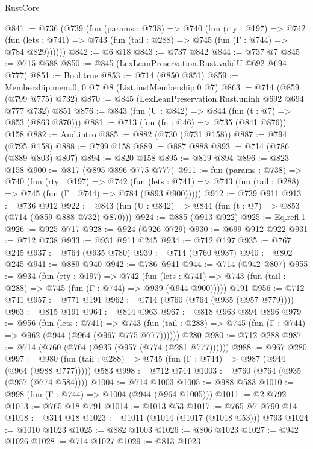 \begin{lexlean}{RustCore}
\begin{coremodule}
@841 := @736
    (@739
      (fun (params : @738) =>
      @740
        (fun (rty : @197) =>
        @742
          (fun (lets : @741) => @743 (fun (tail : @288) => @745 (fun (Γ : @744) => @784 @829))))))
@842 := @6 @18
@843 := @737 @842
@844 := @737 @7
@845 := @715 @688
@850 := @845 (LexLeanPreservation.Rust.validU @692 @694 @777)
@851 := Bool.true
@853 := @714 (@850 @851)
@859 := Membership.mem.{0, 0} @7 @8 (List.instMembership.{0} @7)
@863 := @714 (@859 (@799 @775) @732)
@870 := @845 (LexLeanPreservation.Rust.uninh @692 @694 @777 @732) @851
@876 := @843 (fun (U : @842) => @844 (fun (t : @7) => @853 (@863 @870)))
@881 := @713 (fun (fn : @46) => @735 (@841 @876)) @158
@882 := And.intro
@885 := @882 (@730 (@731 @158))
@887 := @794 (@795 @158)
@888 := @799 @158
@889 := @887 @888
@893 := @714 (@786 (@889 @803) @807)
@894 := @820 @158
@895 := @819 @894
@896 := @823 @158
@900 := @817 (@895 @896 @775 @777)
@911 := fun (params : @738) =>
  @740
    (fun (rty : @197) =>
    @742
      (fun (lets : @741) => @743 (fun (tail : @288) => @745 (fun (Γ : @744) => @784 (@893 @900)))))
@912 := @739 @911
@913 := @736 @912
@922 := @843 (fun (U : @842) => @844 (fun (t : @7) => @853 (@714 (@859 @888 @732) @870)))
@924 := @885 (@913 @922)
@925 := Eq.refl.{1}
@926 := @925 @717
@928 := @924 (@926 @729)
@930 := @699 @912 @922
@931 := @712 @738
@933 := @931 @911 @245
@934 := @712 @197
@935 := @767 @245
@937 := @764 (@935 @780)
@939 := @714 (@760 @937)
@940 := @802 @245
@941 := @889 @940
@942 := @786 @941
@944 := @714 (@942 @807)
@955 := @934
    (fun (rty : @197) =>
    @742
      (fun (lets : @741) => @743 (fun (tail : @288) => @745 (fun (Γ : @744) => @939 (@944 @900)))))
    @191
@956 := @712 @741
@957 := @771 @191
@962 := @714 (@760 (@764 (@935 (@957 @779))))
@963 := @815 @191
@964 := @814 @963
@967 := @818 @963 @894 @896
@979 := @956
    (fun (lets : @741) =>
    @743 (fun (tail : @288) => @745 (fun (Γ : @744) => @962 (@944 (@964 (@967 @775 @777))))))
    @280
@980 := @712 @288
@987 := @714 (@760 (@764 (@935 (@957 (@774 (@281 @777))))))
@988 := @967 @280
@997 := @980 (fun (tail : @288) => @745 (fun (Γ : @744) => @987 (@944 (@964 (@988 @777))))) @583
@998 := @712 @744
@1003 := @760 (@764 (@935 (@957 (@774 @584))))
@1004 := @714 @1003
@1005 := @988 @583
@1010 := @998 (fun (Γ : @744) => @1004 (@944 (@964 @1005)))
@1011 := @2 @792
@1013 := @765 @18 @791
@1014 := @1013 @53
@1017 := @765 @7 @790 @14
@1018 := @314 @18
@1023 := @1011 (@1014 (@1017 (@1018 @53))) @793
@1024 := @1010 @1023
@1025 := @882 @1003
@1026 := @806 @1023
@1027 := @942 @1026
@1028 := @714 @1027
@1029 := @813 @1023

\end{coremodule}
\end{lexlean}
